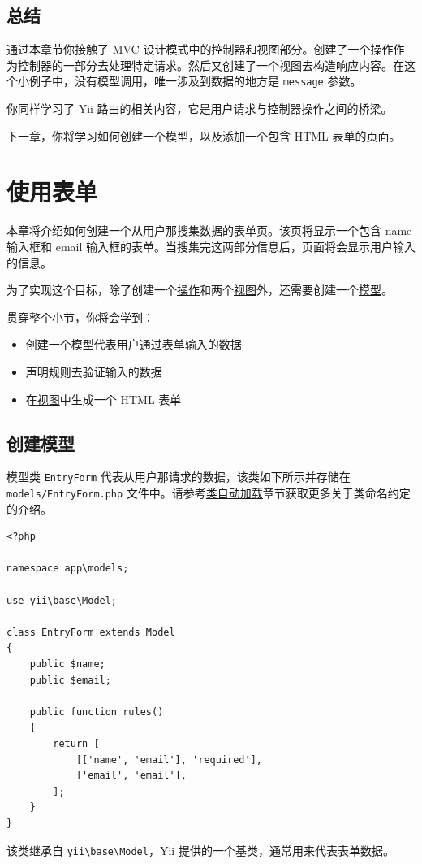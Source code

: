 \subsection{总结 \label{start-hello.md::summary}}
通过本章节你接触了 MVC 设计模式中的控制器和视图部分。创建了一个操作作为控制器的一部分去处理特定请求。然后又创建了一个视图去构造响应内容。在这个小例子中，没有模型调用，唯一涉及到数据的地方是 \lstinline|message| 参数。

你同样学习了 Yii 路由的相关内容，它是用户请求与控制器操作之间的桥梁。

下一章，你将学习如何创建一个模型，以及添加一个包含 HTML 表单的页面。



\label{start-forms.md}\section{使用表单}
本章将介绍如何创建一个从用户那搜集数据的表单页。该页将显示一个包含 name 输入框和 email 输入框的表单。当搜集完这两部分信息后，页面将会显示用户输入的信息。

为了实现这个目标，除了创建一个\hyperref[structure-controllers.md]{操作}和两个\hyperref[structure-views]{视图}外，还需要创建一个\hyperref[structure-models.md]{模型}。

贯穿整个小节，你将会学到：

\begin{itemize}
\item 创建一个\hyperref[structure-models.md]{模型}代表用户通过表单输入的数据
\item 声明规则去验证输入的数据
\item 在\hyperref[structure-views.md]{视图}中生成一个 HTML 表单
\end{itemize}
\subsection{创建模型 \label{start-forms.md::creating-model}}
模型类 \lstinline|EntryForm| 代表从用户那请求的数据，该类如下所示并存储在 \lstinline|models/EntryForm.php| 文件中。请参考\hyperref[concept-autoloading.md]{类自动加载}章节获取更多关于类命名约定的介绍。

\lstset{language=php}\begin{lstlisting}
<?php

namespace app\models;

use yii\base\Model;

class EntryForm extends Model
{
    public $name;
    public $email;

    public function rules()
    {
        return [
            [['name', 'email'], 'required'],
            ['email', 'email'],
        ];
    }
}
\end{lstlisting}
该类继承自 \texttt{yii{\allowbreak{}\textbackslash}base{\allowbreak{}\textbackslash}Model}，Yii 提供的一个基类，通常用来代表表单数据。

